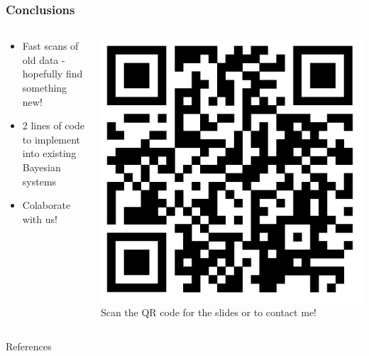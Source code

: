 \documentclass{beamer}
\begin{document}
      \begin{frame}
        \frametitle{Conclusions}
        \begin{columns}
        \begin{column}{0.5\textwidth}
          \begin{itemize}
            \item Fast scans of old data - hopefully find something new!
            \item 2 lines of code to implement into existing Bayesian systems
            \item Colaborate with us!
        \end{itemize}
      \end{column}
      \begin{column}{0.5\textwidth}
        \includegraphics[width=1\textwidth]{qr.png}
        Scan the QR code for the slides or to contact me!
      \end{column}
    \end{columns}
  \end{frame}

    \begin{frame}[t]{References}
    
    \end{frame}
\end{document}
